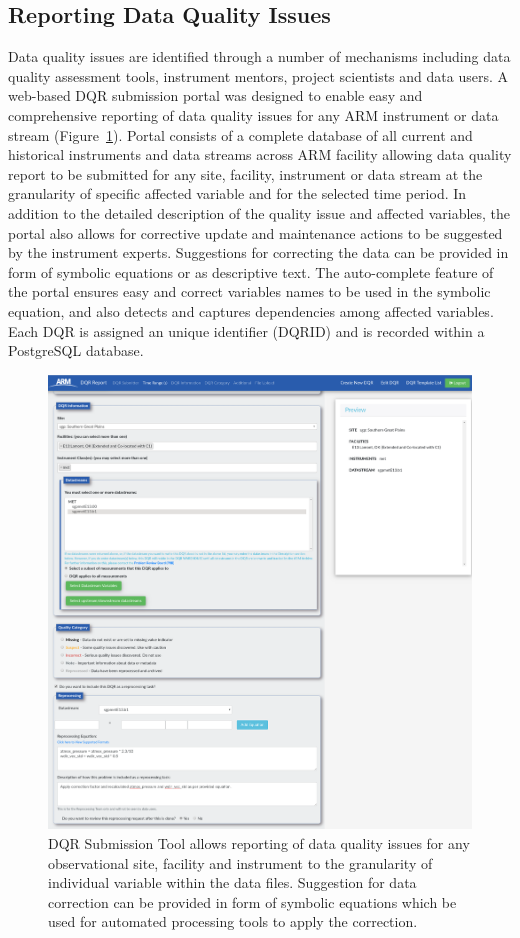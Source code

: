 \subsection{Reporting Data Quality Issues}
Data quality issues are identified through a number of mechanisms
including data quality assessment tools, instrument mentors, project
scientists and data users. 
A web-based DQR submission portal was designed to enable easy 
and comprehensive reporting of data quality issues for
any ARM instrument or data stream (Figure~\ref{fig:dqr_tool}). Portal
consists of a complete database of all current and historical
instruments and data streams across ARM facility allowing data quality
report to be submitted for any site, facility, instrument or data stream
at the granularity of specific affected variable and for the selected time
period. In addition to the detailed description of the quality issue and
affected variables, the portal also allows for corrective update and
maintenance actions to be suggested by the instrument experts.
Suggestions for correcting the data can be provided in form of symbolic
equations or as descriptive text. The auto-complete feature of the portal ensures easy and correct
variables names to be used in the symbolic equation, and also detects and
captures dependencies among affected variables. Each DQR is assigned an unique identifier
(DQRID) and is recorded within a PostgreSQL database.

\begin{figure}
 \includegraphics[width=\columnwidth]{figures/dqr_tool.png}
 \caption{DQR Submission Tool allows reporting of data quality issues
	for any observational site, facility and instrument to the
	granularity of individual variable within the data files. Suggestion
 for data correction can be provided in form of symbolic equations which
 be used for automated processing tools to apply the correction.}
 \label{fig:dqr_tool}
\end{figure}
